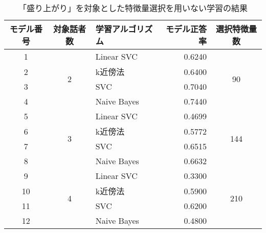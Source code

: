 \begin{table}[ptb]
    \caption{「盛り上がり」を対象とした特徴量選択を用いない学習の結果}
    \centering
    \begin{tabular}{|c|c|l|r|c|}
        \hline
        モデル番号 & 対象話者数 & 学習アルゴリズム & モデル正答率 & 選択特徴量数 \\\hline\hline
        1 & \multirow{4}{*}{2} & Linear SVC & 0.6240 & \multirow{4}{*}{90} \\ \cline{1-1}\cline{3-4}
        2 & & k近傍法 & 0.6400 & \\ \cline{1-1}\cline{3-4}
        3 & & SVC & 0.7040 & \\ \cline{1-1}\cline{3-4}
        4 & & Naive Bayes & 0.7440 & \\ \hline
        5 & \multirow{4}{*}{3} & Linear SVC & 0.4699 & \multirow{4}{*}{144} \\ \cline{1-1}\cline{3-4}
        6 & & k近傍法 & 0.5772 & \\ \cline{1-1}\cline{3-4}
        7 & & SVC & 0.6515 & \\ \cline{1-1}\cline{3-4}
        8 & & Naive Bayes & 0.6632 & \\ \hline
        9 & \multirow{4}{*}{4} & Linear SVC & 0.3300 & \multirow{4}{*}{210} \\ \cline{1-1}\cline{3-4}
        10 & & k近傍法 & 0.5900 & \\ \cline{1-1}\cline{3-4}
        11 & & SVC & 0.6200 & \\ \cline{1-1}\cline{3-4}
        12 & & Naive Bayes & 0.4800 & \\ \hline
    \end{tabular}
    \label{tab:excitement_learning_result_without_FS}
\end{table}

